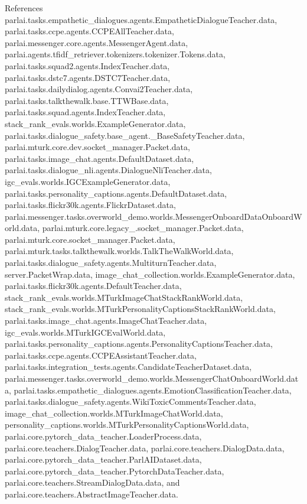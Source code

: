 References parlai.\+tasks.\+empathetic\+\_\+dialogues.\+agents.\+Empathetic\+Dialogue\+Teacher.\+data, parlai.\+tasks.\+ccpe.\+agents.\+C\+C\+P\+E\+All\+Teacher.\+data, parlai.\+messenger.\+core.\+agents.\+Messenger\+Agent.\+data, parlai.\+agents.\+tfidf\+\_\+retriever.\+tokenizers.\+tokenizer.\+Tokens.\+data, parlai.\+tasks.\+squad2.\+agents.\+Index\+Teacher.\+data, parlai.\+tasks.\+dstc7.\+agents.\+D\+S\+T\+C7\+Teacher.\+data, parlai.\+tasks.\+dailydialog.\+agents.\+Convai2\+Teacher.\+data, parlai.\+tasks.\+talkthewalk.\+base.\+T\+T\+W\+Base.\+data, parlai.\+tasks.\+squad.\+agents.\+Index\+Teacher.\+data, stack\+\_\+rank\+\_\+evals.\+worlds.\+Example\+Generator.\+data, parlai.\+tasks.\+dialogue\+\_\+safety.\+base\+\_\+agent.\+\_\+\+Base\+Safety\+Teacher.\+data, parlai.\+mturk.\+core.\+dev.\+socket\+\_\+manager.\+Packet.\+data, parlai.\+tasks.\+image\+\_\+chat.\+agents.\+Default\+Dataset.\+data, parlai.\+tasks.\+dialogue\+\_\+nli.\+agents.\+Dialogue\+Nli\+Teacher.\+data, igc\+\_\+evals.\+worlds.\+I\+G\+C\+Example\+Generator.\+data, parlai.\+tasks.\+personality\+\_\+captions.\+agents.\+Default\+Dataset.\+data, parlai.\+tasks.\+flickr30k.\+agents.\+Flickr\+Dataset.\+data, parlai.\+messenger.\+tasks.\+overworld\+\_\+demo.\+worlds.\+Messenger\+Onboard\+Data\+Onboard\+World.\+data, parlai.\+mturk.\+core.\+legacy\+\_.\+socket\+\_\+manager.\+Packet.\+data, parlai.\+mturk.\+core.\+socket\+\_\+manager.\+Packet.\+data, parlai.\+mturk.\+tasks.\+talkthewalk.\+worlds.\+Talk\+The\+Walk\+World.\+data, parlai.\+tasks.\+dialogue\+\_\+safety.\+agents.\+Multiturn\+Teacher.\+data, server.\+Packet\+Wrap.\+data, image\+\_\+chat\+\_\+collection.\+worlds.\+Example\+Generator.\+data, parlai.\+tasks.\+flickr30k.\+agents.\+Default\+Teacher.\+data, stack\+\_\+rank\+\_\+evals.\+worlds.\+M\+Turk\+Image\+Chat\+Stack\+Rank\+World.\+data, stack\+\_\+rank\+\_\+evals.\+worlds.\+M\+Turk\+Personality\+Captions\+Stack\+Rank\+World.\+data, parlai.\+tasks.\+image\+\_\+chat.\+agents.\+Image\+Chat\+Teacher.\+data, igc\+\_\+evals.\+worlds.\+M\+Turk\+I\+G\+C\+Eval\+World.\+data, parlai.\+tasks.\+personality\+\_\+captions.\+agents.\+Personality\+Captions\+Teacher.\+data, parlai.\+tasks.\+ccpe.\+agents.\+C\+C\+P\+E\+Assistant\+Teacher.\+data, parlai.\+tasks.\+integration\+\_\+tests.\+agents.\+Candidate\+Teacher\+Dataset.\+data, parlai.\+messenger.\+tasks.\+overworld\+\_\+demo.\+worlds.\+Messenger\+Chat\+Onboard\+World.\+data, parlai.\+tasks.\+empathetic\+\_\+dialogues.\+agents.\+Emotion\+Classification\+Teacher.\+data, parlai.\+tasks.\+dialogue\+\_\+safety.\+agents.\+Wiki\+Toxic\+Comments\+Teacher.\+data, image\+\_\+chat\+\_\+collection.\+worlds.\+M\+Turk\+Image\+Chat\+World.\+data, personality\+\_\+captions.\+worlds.\+M\+Turk\+Personality\+Captions\+World.\+data, parlai.\+core.\+pytorch\+\_\+data\+\_\+teacher.\+Loader\+Process.\+data, parlai.\+core.\+teachers.\+Dialog\+Teacher.\+data, parlai.\+core.\+teachers.\+Dialog\+Data.\+data, parlai.\+core.\+pytorch\+\_\+data\+\_\+teacher.\+Parl\+A\+I\+Dataset.\+data, parlai.\+core.\+pytorch\+\_\+data\+\_\+teacher.\+Pytorch\+Data\+Teacher.\+data, parlai.\+core.\+teachers.\+Stream\+Dialog\+Data.\+data, and parlai.\+core.\+teachers.\+Abstract\+Image\+Teacher.\+data.



